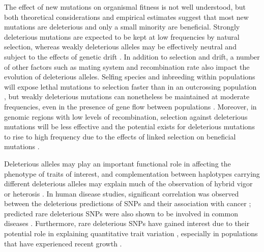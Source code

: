 \documentclass[12pt]{article}
\begin{document}
The effect of new mutations on organismal fitness is not well understood, but both theoretical considerations \citep{Fisher1930} and empirical estimates \citep{Joseph2004} suggest that most new mutations are deleterious and only a small minority are beneficial. Strongly deleterious mutations are expected to be kept at low frequencies by natural selection, whereas weakly deleterious alleles may be effectively neutral \citep{Ohta1973, Kimura1983} and subject to the effects of genetic drift \citep{Lynch1990,Lande1994,Whitlock2003}. In addition to selection and drift, a number of other factors such as mating system and recombination rate also impact the evolution of deleterious alleles. Selfing species and inbreeding within populations will expose lethal mutations to selection faster than in an outcrossing population \citep{Wang1999,Glemin2003}, but weakly deleterious mutations  can nonetheless be maintained at moderate frequencies, even in the presence of gene flow between populations \citep{Whitlock2000}. Moreover, in genomic regions with low levels of recombination, selection against deleterious mutations will be less effective \citep{Charlesworth1993fp} and the potential exists for deleterious mutations to rise to high frequency due to the effects of linked selection on beneficial mutations \citep{Felsenstein1974, Hill1966, Chun2011}. 
 
Deleterious alleles may play an important functional role in affecting the phenotype of traits of interest, and complementation between haplotypes carrying different deleterious alleles may explain much of the observation of hybrid vigor or heterosis \citep{Charlesworth2009}. 
In human disease studies, significant correlation was observed between the deleterious predictions of SNPs and their association with cancer \citep{Zhu2004}; predicted rare deleterious SNPs were also shown to be involved in common diseases \citep{Cohen2004,Smigrodzki2004}.
Furthermore, rare deleterious SNPs have gained interest due to their potential role in explaining quantitative trait variation \citep{Gibson2012}, especially in populations that have experienced recent growth \citep{LohmuellerArXiv} .
\end{document}

